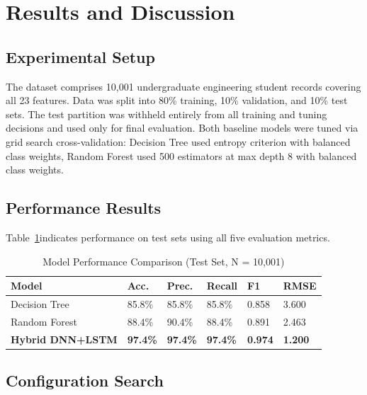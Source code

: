 \documentclass[conference]{IEEEtran}
\begin{document}
\section{Results and Discussion}
\label{sec:results}

\subsection{Experimental Setup}

The dataset comprises 10,001 undergraduate engineering student records covering all 23 features. Data was split into 80\% training, 10\% validation, and 10\% test sets. The test partition was withheld entirely from all training and tuning decisions and used only for final evaluation. Both baseline models were tuned via grid search cross-validation: Decision Tree used entropy criterion with balanced class weights, Random Forest used 500 estimators at max depth 8 with balanced class weights.

\subsection{Performance Results}

Table~\ref{tab:results}indicates performance on test sets using all five evaluation metrics.


\begin{table}
\caption{Model Performance Comparison (Test Set, N = 10,001)}
\label{tab:results}
\centering
\renewcommand{\arraystretch}{1.3}
\begin{tabular}{|p{2.1cm}|p{0.8cm}|p{0.8cm}|p{0.85cm}|p{0.7cm}|p{0.75cm}|}
\hline
\textbf{Model} & \textbf{Acc.} & \textbf{Prec.} & \textbf{Recall} & \textbf{F1} & \textbf{RMSE} \\
\hline
Decision Tree & 85.8\% & 85.8\% & 85.8\% & 0.858 & 3.600 \\
\hline
Random Forest & 88.4\% & 90.4\% & 88.4\% & 0.891 & 2.463 \\
\hline
\textbf{Hybrid DNN+LSTM} & \textbf{97.4\%} & \textbf{97.4\%} & \textbf{97.4\%} & \textbf{0.974} & \textbf{1.200} \\
\hline
\end{tabular}
\end{table}

\subsection{Configuration Search}
\end{document}
